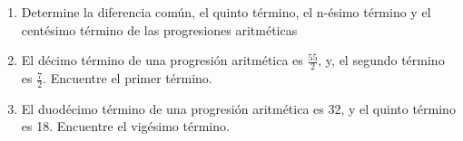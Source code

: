 \documentclass[10pt,twoside]{article}
\begin{document}
\begin{enumerate}
\section*{Sucesiones y progresiones}
Para las secuencias dadas en \ref{first}--\ref{second}
\begin{enumerate}
\item Encuentre los cinco primeros términos para la sucesión dada.
\item ¿Cuál es la diferencia común $d$?
\item Grafique los términos que encuentre en \textit{a)}
\end{enumerate}
\ref{third}--\ref{fourth} Encuentre el $n-\'{e}simo$ t\'{e}rmino de la progresi\'{o}n aritm\'{e}tica dado el primer t\'{e}rmino $a_{1}$ y la diferencia com\'{u}n $d$. ¿Cu\'{a}l es el d\'{e}cimo t\'{e}rmino?
\item Determine la diferencia común, el quinto término, el n-ésimo término y el centésimo término de las progresiones aritméticas
\begin{enumerate}
\end{enumerate}
\item El décimo término de una progresión aritmética es $\frac{55}{2}$, y, el segundo término es $\frac{7}{2}$. Encuentre el primer término.
\item El duodécimo término de una progresión aritmética es 32, y el quinto término es 18. Encuentre el vigésimo término.


\end{enumerate}
\end{document}
